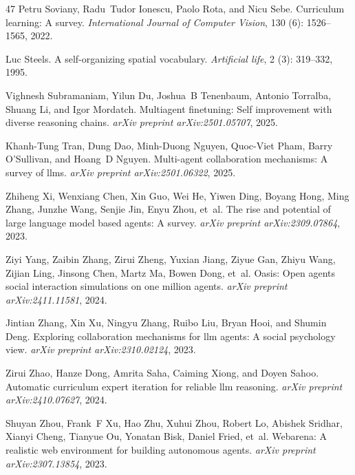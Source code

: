 \begin{thebibliography}{47}
Petru Soviany, Radu~Tudor Ionescu, Paolo Rota, and Nicu Sebe.
\newblock Curriculum learning: A survey.
\newblock \emph{International Journal of Computer Vision}, 130 (6): 1526--1565, 2022.

Luc Steels.
\newblock A self-organizing spatial vocabulary.
\newblock \emph{Artificial life}, 2 (3): 319--332, 1995.

Vighnesh Subramaniam, Yilun Du, Joshua~B Tenenbaum, Antonio Torralba, Shuang Li, and Igor Mordatch.
\newblock Multiagent finetuning: Self improvement with diverse reasoning chains.
\newblock \emph{arXiv preprint arXiv:2501.05707}, 2025.

Khanh-Tung Tran, Dung Dao, Minh-Duong Nguyen, Quoc-Viet Pham, Barry O'Sullivan, and Hoang~D Nguyen.
\newblock Multi-agent collaboration mechanisms: A survey of llms.
\newblock \emph{arXiv preprint arXiv:2501.06322}, 2025.

Zhiheng Xi, Wenxiang Chen, Xin Guo, Wei He, Yiwen Ding, Boyang Hong, Ming Zhang, Junzhe Wang, Senjie Jin, Enyu Zhou, et~al.
\newblock The rise and potential of large language model based agents: A survey.
\newblock \emph{arXiv preprint arXiv:2309.07864}, 2023.

Ziyi Yang, Zaibin Zhang, Zirui Zheng, Yuxian Jiang, Ziyue Gan, Zhiyu Wang, Zijian Ling, Jinsong Chen, Martz Ma, Bowen Dong, et~al.
\newblock Oasis: Open agents social interaction simulations on one million agents.
\newblock \emph{arXiv preprint arXiv:2411.11581}, 2024.

Jintian Zhang, Xin Xu, Ningyu Zhang, Ruibo Liu, Bryan Hooi, and Shumin Deng.
\newblock Exploring collaboration mechanisms for llm agents: A social psychology view.
\newblock \emph{arXiv preprint arXiv:2310.02124}, 2023.

Zirui Zhao, Hanze Dong, Amrita Saha, Caiming Xiong, and Doyen Sahoo.
\newblock Automatic curriculum expert iteration for reliable llm reasoning.
\newblock \emph{arXiv preprint arXiv:2410.07627}, 2024.

Shuyan Zhou, Frank~F Xu, Hao Zhu, Xuhui Zhou, Robert Lo, Abishek Sridhar, Xianyi Cheng, Tianyue Ou, Yonatan Bisk, Daniel Fried, et~al.
\newblock Webarena: A realistic web environment for building autonomous agents.
\newblock \emph{arXiv preprint arXiv:2307.13854}, 2023.

\end{thebibliography}
